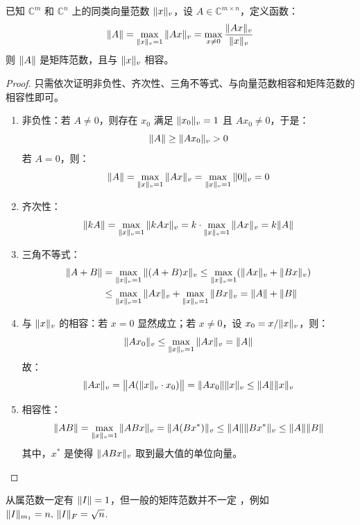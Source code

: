 \begin{definition}[从属范数]
已知 $\mathbb C^m$ 和 $\mathbb C^n$ 上的同类向量范数 $\Vert x\Vert_v$，设 $A\in\mathbb C^{m\times n}$，定义函数：
\[
    \Vert A\Vert=\max_{\Vert x\Vert_v=1}\Vert Ax\Vert_v=\max_{x\neq 0}\frac{\Vert Ax\Vert_v}{\Vert x\Vert_v}
\]
则 $\Vert A\Vert$ 是矩阵范数，且与 $\Vert x\Vert_v$ 相容。
\end{definition}
\begin{proof}
只需依次证明非负性、齐次性、三角不等式、与向量范数相容和矩阵范数的相容性即可。
\begin{enumerate}
    \item 非负性：若 $A\neq0$，则存在 $x_0$ 满足 $\Vert x_0\Vert_v=1$ 且 $Ax_0\neq 0$，于是：
    \[\Vert A\Vert\geq\Vert Ax_0\Vert_v>0\]
    若 $A=0$，则：
    \[\Vert A\Vert=\max_{\Vert x\Vert_v=1}\Vert Ax\Vert_v=\max_{\Vert x\Vert_v=1}\Vert0\Vert_v=0\]

    \item 齐次性：
    \[
        \Vert kA\Vert=\max_{\Vert x\Vert_v=1}\Vert kAx\Vert_v=k\cdot\max_{\Vert x\Vert_v=1}\Vert Ax\Vert_v=k\Vert A\Vert
    \]

    \item 三角不等式：
    \begin{align*}
        \Vert A+B\Vert&=\max_{\Vert x\Vert_v=1}\Vert(A+B)x\Vert_v
        \leq\max_{\Vert x\Vert_v=1}(\Vert Ax\Vert_v+\Vert Bx\Vert_v)\\
        &\leq\max_{\Vert x\Vert_v=1}\Vert Ax\Vert_v+\max_{\Vert x\Vert_v=1}\Vert Bx\Vert_v
        =\Vert A\Vert+\Vert B\Vert\\
    \end{align*}

    \item 与 $\Vert x\Vert_v$ 的相容：若 $x=0$ 显然成立；若 $x\neq 0$，设 $x_0=x/\Vert x\Vert_v$，则：
    \[
        \Vert Ax_0\Vert_v\leq\max_{\Vert x\Vert_v=1}\Vert Ax\Vert_v=\Vert A\Vert
    \]
    故：
    \[
        \Vert Ax\Vert_v=\big\Vert{A(\Vert x\Vert_v\cdot x_0)}\big\Vert=\Vert Ax_0\Vert\Vert x\Vert_v\leq\Vert A\Vert\Vert x\Vert_v
    \]

    \item 相容性：
    \[
        \Vert AB\Vert=\max_{\Vert x\Vert_v=1}\Vert ABx\Vert_v=\Vert A(Bx^\ast)\Vert_v\leq\Vert A\Vert\Vert Bx^\ast\Vert_v\leq\Vert A\Vert\Vert B\Vert
    \]
    其中，$x^\ast$ 是使得 $\Vert ABx\Vert_v$ 取到最大值的单位向量。

\end{enumerate}
\end{proof}

\begin{property}
从属范数一定有 $\Vert I\Vert=1$，但一般的矩阵范数并不一定 ，例如  $\Vert I\Vert_{m_1}=n,\,\Vert I\Vert_F=\sqrt{n}$.
\end{property}

